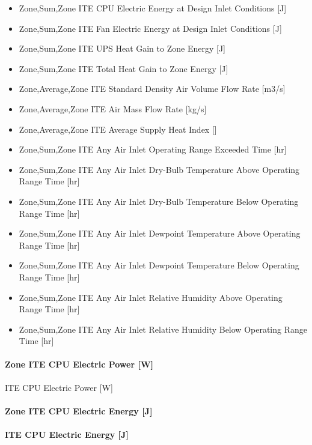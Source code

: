 \begin{itemize}
\item
  Zone,Sum,Zone ITE CPU Electric Energy at Design Inlet Conditions {[}J{]}
\item
  Zone,Sum,Zone ITE Fan Electric Energy at Design Inlet Conditions {[}J{]}
\item
  Zone,Sum,Zone ITE UPS Heat Gain to Zone Energy {[}J{]}
\item
  Zone,Sum,Zone ITE Total Heat Gain to Zone Energy {[}J{]}
\item
  Zone,Average,Zone ITE Standard Density Air Volume Flow Rate {[}m3/s{]}
\item
  Zone,Average,Zone ITE Air Mass Flow Rate {[}kg/s{]}
\item
  Zone,Average,Zone ITE Average Supply Heat Index {[]}
\item
  Zone,Sum,Zone ITE Any Air Inlet Operating Range Exceeded Time {[}hr{]}
\item
  Zone,Sum,Zone ITE Any Air Inlet Dry-Bulb Temperature Above Operating Range Time {[}hr{]}
\item
  Zone,Sum,Zone ITE Any Air Inlet Dry-Bulb Temperature Below Operating Range Time {[}hr{]}
\item
  Zone,Sum,Zone ITE Any Air Inlet Dewpoint Temperature Above Operating Range Time {[}hr{]}
\item
  Zone,Sum,Zone ITE Any Air Inlet Dewpoint Temperature Below Operating Range Time {[}hr{]}
\item
  Zone,Sum,Zone ITE Any Air Inlet Relative Humidity Above Operating Range Time {[}hr{]}
\item
  Zone,Sum,Zone ITE Any Air Inlet Relative Humidity Below Operating Range Time {[}hr{]}
\end{itemize}

\paragraph{Zone ITE CPU Electric Power {[}W{]}}\label{zone-ite-cpu-electric-power-w}

ITE CPU Electric Power {[}W{]}

\paragraph{Zone ITE CPU Electric Energy {[}J{]}}\label{zone-ite-cpu-electric-energy-j}

\paragraph{ITE CPU Electric Energy {[}J{]}}\label{ite-cpu-electric-energy-j}

